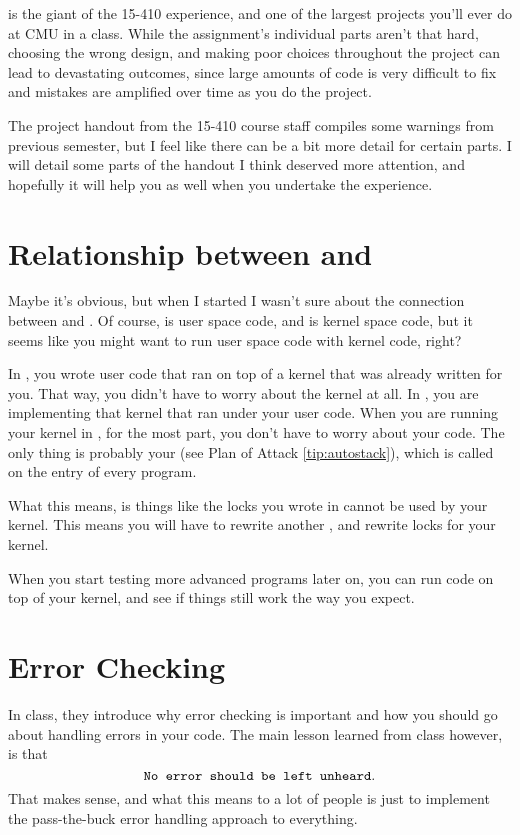 \documentclass{article}
\begin{document}
\thispagestyle{empty} %
\maketitle
{} is the giant of the 15-410 experience, and one of the largest
projects you'll ever do at CMU in a class. While the assignment's individual
parts aren't that hard, choosing the wrong design, and making poor choices
throughout the project can lead to devastating outcomes, since large amounts
of code is very difficult to fix and mistakes are amplified over time as you
do the project.

The project handout from the 15-410 course staff compiles some warnings from
previous semester, but I feel like there can be a bit more detail for certain
parts. I will detail some parts of the handout I think deserved more
attention, and hopefully it will help you as well when you undertake the
 experience.

\section{Relationship between  and }
Maybe it's obvious, but when I started  I wasn't sure about the
connection between  and . Of course,  is user space
code, and  is kernel space code, but it seems like you might want to
run user space code with kernel code, right?

In , you wrote user code that ran on top of a kernel that was already
written for you. That way, you didn't have to worry about the kernel at all.
In , you are implementing that kernel that ran under your user code.
When you are running your kernel in , for the most part, you don't
have to worry about your  code. The only thing is probably your
 (see Plan of Attack \ref{tip:autostack}), which is
called on the entry of every program.

What this means, is things like the locks you wrote in  cannot be used
by your  kernel. This means you will have to rewrite another
, and rewrite locks for your  kernel.

When you start testing more advanced programs later on, you can run 
code on top of your  kernel, and see if things still work the way you
expect.

\section{Error Checking}
\label{sec:error}
In class, they introduce why error checking is important and how you should
go about handling errors in your code. The main lesson learned from class
however, is that
\begin{equation}
  \texttt{No error should be left unheard}.
\end{equation}
That makes sense, and what this means to a lot of people is just to implement
the pass-the-buck error handling approach to everything.
\end{document}
